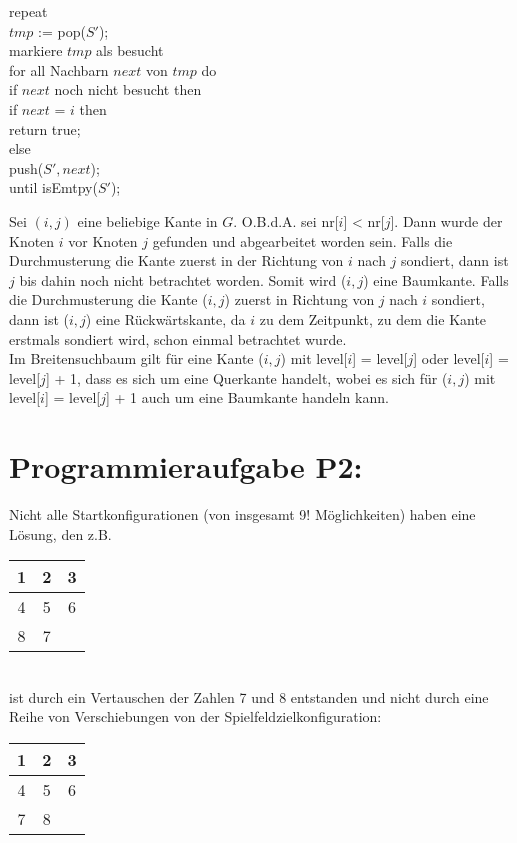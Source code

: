 \documentclass[11pt]{scrartcl} %
\begin{document}
\begin{compactenum}[(a)]
\begin{minipage}[t]{0.5em}
\begin{tabbing}
		\> repeat\\
		\>\> $tmp$ := pop($S'$);\\
		\>\> markiere $tmp$ als besucht\\
		\>\> for all Nachbarn $next$ von $tmp$ do\\
		\>\>\> if $next$ noch nicht besucht then\\
		\>\>\>\> if $next$ = $i$ then\\
		\>\>\>\>\> return true;\\
		\>\>\>\> else\\
		\>\>\>\>\> push($S',next$);\\
		\> until isEmtpy($S'$);
		\end{tabbing}
	\end{minipage}
	\item Sei $(i,j)$ eine beliebige Kante in $G$. O.B.d.A. sei nr[$i$] < nr[$j$]. Dann wurde der Knoten $i$ vor Knoten $j$ gefunden und abgearbeitet worden sein. Falls die Durchmusterung die Kante zuerst in der Richtung von $i$ nach $j$ sondiert, dann ist $j$ bis dahin noch nicht betrachtet worden. Somit wird ($i,j$) eine Baumkante. Falls die Durchmusterung die Kante ($i,j$) zuerst in Richtung von $j$ nach $i$ sondiert, dann ist ($i,j$) eine Rückwärtskante, da $i$ zu dem Zeitpunkt, zu dem die Kante erstmals sondiert wird, schon einmal betrachtet wurde.\\
	Im Breitensuchbaum gilt für eine Kante ($i,j$) mit level[$i$] = level[$j$] oder level[$i$] = level[$j$] + 1, dass es sich um eine Querkante handelt, wobei es sich für ($i,j$) mit level[$i$] = level[$j$] + 1 auch um eine Baumkante handeln kann.
\end{compactenum}
\section*{Programmieraufgabe P2:}
\begin{compactenum}[(c)]
	\item Nicht alle Startkonfigurationen (von insgesamt 9! Möglichkeiten) haben eine Lösung, den z.B.\\
	\begin{tabular}{|c|c|c|}
		\hline
		1 & 2 & 3\\
		\hline
		4 & 5 & 6\\
		\hline
		8 & 7 &\\
		\hline
	\end{tabular}
	\\ist durch ein Vertauschen der Zahlen 7 und 8 entstanden und nicht durch eine Reihe von Verschiebungen von der Spielfeldzielkonfiguration:\\
	\begin{tabular}{|c|c|c|}
		\hline
		1 & 2 & 3\\
		\hline
		4 & 5 & 6\\
		\hline
		7 & 8 &\\
		\hline
	\end{tabular}
\end{compactenum}
\end{document}
